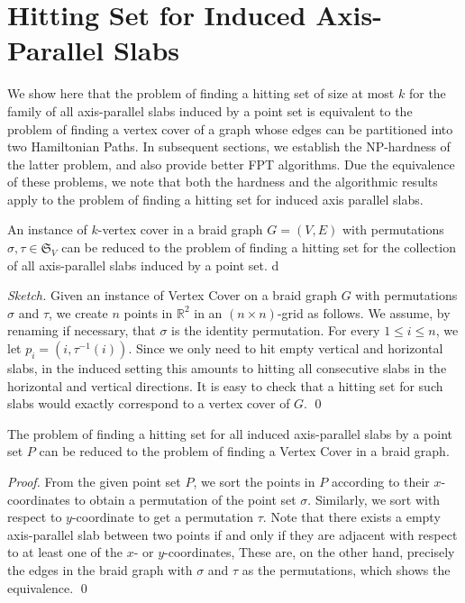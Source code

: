 \documentclass[svgnames]{llncs}
\newcommand{\braid}{braid}
\begin{document}
 



\section{Hitting Set for Induced Axis-Parallel Slabs}

We show here that the problem of finding a hitting set of size at most $k$ for the family of all axis-parallel slabs induced by a point set is equivalent to the problem of 
finding a vertex cover of a graph whose edges can be partitioned into two Hamiltonian Paths. In subsequent sections, we establish the NP-hardness of the latter problem, and also provide better FPT algorithms. Due the equivalence of these problems, we note that both the hardness and the algorithmic results apply to the problem of finding a hitting set for induced axis parallel slabs. 

\begin{lemma}
An instance of $k$-vertex cover in a \braid{} graph $G=(V,E)$ with permutations $\sigma,\tau \in \mathfrak{S}_V$ can be reduced to the problem of finding a hitting set for the collection of all axis-parallel slabs induced 
by a point set. 
\label{dgapstohp}
d\end{lemma}

\begin{proof}[Sketch] Given an instance of Vertex Cover on a braid graph $G$ with permutations $\sigma$ and $\tau$, we create $n$ points in $\mathbb{R}^2$ in an $(n\times n)$-grid as follows. We assume, by renaming if necessary, that $\sigma$ is the identity permutation. For every $1 \leq i \leq n$, we let $p_i = (i,\tau^{-1}(i))$. Since we only need to hit empty vertical and horizontal slabs, in the induced setting this amounts to hitting all consecutive slabs in the horizontal and vertical directions. It is easy to check that a hitting set for such slabs would exactly correspond to a vertex cover of $G$. \qed
\end{proof}



\begin{lemma}
The problem of finding a hitting set for all induced axis-parallel slabs by a point set $P$ can be reduced to the problem of finding a Vertex Cover in a \braid{} graph. 
\end{lemma}
\begin{proof}From the given point set $P$, we sort the points in $P$ according to their $x$-coordinates to obtain a permutation of the point set $\sigma$. Similarly, we sort with respect to $y$-coordinate to get a permutation 
$\tau$. Note that there exists a empty axis-parallel slab between two points if and only if they are adjacent with respect to at least one of the $x$- or $y$-coordinates, These are, on the other
hand, precisely the edges in the braid graph with $\sigma$ and $\tau$ as the permutations, which shows the equivalence. 
\qed
\end{proof}
\end{document}

